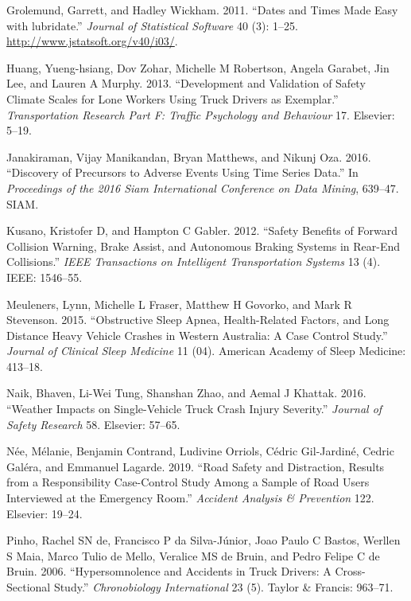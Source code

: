 \documentclass[]{elsarticle} %
\begin{document}
\leavevmode\hypertarget{ref-Rlubridate}{}%
Grolemund, Garrett, and Hadley Wickham. 2011. ``Dates and Times Made Easy with lubridate.'' \emph{Journal of Statistical Software} 40 (3): 1--25. \url{http://www.jstatsoft.org/v40/i03/}.

\leavevmode\hypertarget{ref-huang2013development}{}%
Huang, Yueng-hsiang, Dov Zohar, Michelle M Robertson, Angela Garabet, Jin Lee, and Lauren A Murphy. 2013. ``Development and Validation of Safety Climate Scales for Lone Workers Using Truck Drivers as Exemplar.'' \emph{Transportation Research Part F: Traffic Psychology and Behaviour} 17. Elsevier: 5--19.

\leavevmode\hypertarget{ref-janakiraman2016discovery}{}%
Janakiraman, Vijay Manikandan, Bryan Matthews, and Nikunj Oza. 2016. ``Discovery of Precursors to Adverse Events Using Time Series Data.'' In \emph{Proceedings of the 2016 Siam International Conference on Data Mining}, 639--47. SIAM.

\leavevmode\hypertarget{ref-kusano2012safety}{}%
Kusano, Kristofer D, and Hampton C Gabler. 2012. ``Safety Benefits of Forward Collision Warning, Brake Assist, and Autonomous Braking Systems in Rear-End Collisions.'' \emph{IEEE Transactions on Intelligent Transportation Systems} 13 (4). IEEE: 1546--55.

\leavevmode\hypertarget{ref-meuleners2015obstructive}{}%
Meuleners, Lynn, Michelle L Fraser, Matthew H Govorko, and Mark R Stevenson. 2015. ``Obstructive Sleep Apnea, Health-Related Factors, and Long Distance Heavy Vehicle Crashes in Western Australia: A Case Control Study.'' \emph{Journal of Clinical Sleep Medicine} 11 (04). American Academy of Sleep Medicine: 413--18.

\leavevmode\hypertarget{ref-naik2016weather}{}%
Naik, Bhaven, Li-Wei Tung, Shanshan Zhao, and Aemal J Khattak. 2016. ``Weather Impacts on Single-Vehicle Truck Crash Injury Severity.'' \emph{Journal of Safety Research} 58. Elsevier: 57--65.

\leavevmode\hypertarget{ref-nee2019road}{}%
Née, Mélanie, Benjamin Contrand, Ludivine Orriols, Cédric Gil-Jardiné, Cedric Galéra, and Emmanuel Lagarde. 2019. ``Road Safety and Distraction, Results from a Responsibility Case-Control Study Among a Sample of Road Users Interviewed at the Emergency Room.'' \emph{Accident Analysis \& Prevention} 122. Elsevier: 19--24.

\leavevmode\hypertarget{ref-de2006hypersomnolence}{}%
Pinho, Rachel SN de, Francisco P da Silva-Júnior, Joao Paulo C Bastos, Werllen S Maia, Marco Tulio de Mello, Veralice MS de Bruin, and Pedro Felipe C de Bruin. 2006. ``Hypersomnolence and Accidents in Truck Drivers: A Cross-Sectional Study.'' \emph{Chronobiology International} 23 (5). Taylor \& Francis: 963--71.
\end{document}
